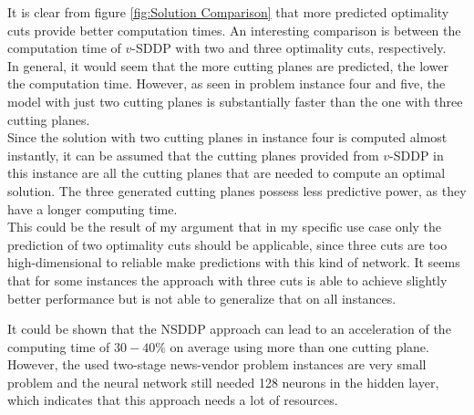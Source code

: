 It is clear from figure \ref{fig:Solution Comparison} that more predicted optimality cuts provide better computation times.
An interesting comparison is between the computation time of $v$-SDDP with two and three optimality cuts, respectively. \\
In general, it would seem that the more cutting planes are predicted, the lower the computation time.
However, as seen in problem instance four and five, the model with just two cutting planes is substantially faster than the one with three cutting planes. \\
Since the solution with two cutting planes in instance four is computed almost instantly, it can be assumed that the cutting planes provided from $v$-SDDP in this instance are all the cutting planes that are needed to compute an optimal solution.
The three generated cutting planes possess less predictive power, as they have a longer computing time. \\
This could be the result of my argument that in my specific use case only the prediction of two optimality cuts should be applicable, since three cuts are too high-dimensional to reliable make predictions with this kind of network.
It seems that for some instances the approach with three cuts is able to achieve slightly better performance but is not able to generalize that on all instances.

It could be shown that the NSDDP approach can lead to an acceleration of the computing time of $30-40\%$ on average using more than one cutting plane.
However, the used two-stage news-vendor problem instances are very small problem and the neural network still needed 128 neurons in the hidden layer, which indicates that this approach needs a lot of resources.
